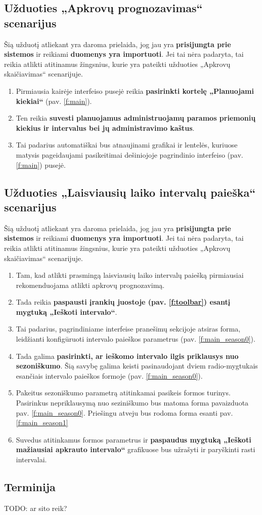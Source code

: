 \subsection{Užduoties „Apkrovų prognozavimas“ scenarijus}
Šią užduotį atliekant yra daroma prielaida, jog jau yra \textbf{prisijungta prie sistemos} ir reikiami \textbf{duomenys yra importuoti}. Jei tai nėra padaryta, tai reikia atlikti atitinamus žingsnius, kurie yra pateikti užduoties „Apkrovų skaičiavimas“ scenarijuje.

\begin{enumerate}
  \item Pirmiausia kairėje interfeiso pusejė reikia \textbf{pasirinkti kortelę „Planuojami kiekiai“} (pav. \ref{f:main}).
  \item Ten reikia \textbf{suvesti planuojamus administruojamų paramos priemonių kiekius ir intervalus bei jų administravimo kaštus}.
  \item Tai padarius automatiškai bus atnaujinami grafikai ir lentelės, kuriuose matysis pageidaujami pasikeitimai dešiniojoje pagrindinio interfeiso (pav. \ref{f:main}) pusejė.
\end{enumerate}


\subsection{Užduoties „Laisviausių laiko intervalų paieška“ scenarijus}
Šią užduotį atliekant yra daroma prielaida, jog jau yra \textbf{prisijungta prie sistemos} ir reikiami \textbf{duomenys yra importuoti}. Jei tai nėra padaryta, tai reikia atlikti atitinamus žingsnius, kurie yra pateikti užduoties „Apkrovų skaičiavimas“ scenarijuje.

\begin{enumerate}
  \item Tam, kad atlikti prasmingą laisviausių laiko intervalų paiešką pirmiausiai rekomenduojama atlikti apkrovų prognozavimą.
  \item Tada reikia \textbf{paspausti įrankių juostoje (pav. \ref{f:toolbar}) esantį mygtuką „Ieškoti intervalo“}.
  \item Tai padarius, pagrindiniame interfeise pranešimų sekcijoje atsiras forma, leidžianti konfigūruoti intervalo paieškos parametrus (pav. \ref{f:main_season0}).
  \item Tada galima \textbf{pasirinkti, ar ieškomo intervalo ilgis priklausys nuo sezoniškumo}. Šią savybę galima keisti pasinaudojant dviem radio-mygtukais esančiais intervalo paieškos formoje (pav. \ref{f:main_season0}).
  \item Pakeitus sezoniškumo parametrą atitinkamai pasikeis formos turinys. Pasirinkus nepriklausymą nuo seziniškumo bus matoma forma pavaizduota pav. \ref{f:main_season0}. Priešingu atveju bus rodoma forma esanti pav. \ref{f:main_season1}
  \item Suvedus atitinkamus formos parametrus ir \textbf{paspaudus mygtuką „Ieškoti mažiausiai apkrauto intervalo“} grafikuose bus užrašyti ir paryškinti rasti intervalai.
\end{enumerate}


\subsection{Terminija}
TODO: ar sito reik?
